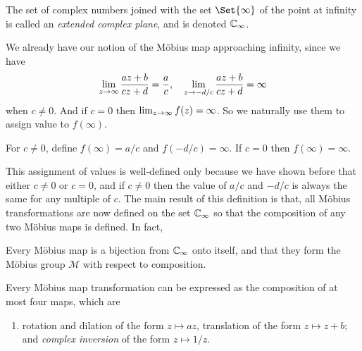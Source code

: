 \documentclass[main.tex]{subfiles}
\begin{document}
		\begin{definition}
			The set of complex numbers joined with the set $\Set{\infty}$ of the point at infinity is called an \textit{extended complex plane}, and is denoted $\mathbb C_\infty$.
		\end{definition}
		We already have our notion of the M\"obius map approaching infinity,  since we have
		\begin{equation*}
			\lim_{z \rightarrow \infty}\frac{az + b}{cz + d} = \frac{a}{c}, \quad \lim_{z \rightarrow {-d}/{c}} \frac{az + b}{cz + d} = \infty
		\end{equation*}
		when $c \neq 0$. And if $c = 0$ then $\lim_{z \rightarrow \infty} f(z) = \infty$. So we naturally use them to assign value to $f(\infty)$.
		\begin{definition}
			For $c \neq 0$, define $f(\infty) = a/c$ and $f(-d/c) = \infty$. If $c = 0$ then $f(\infty) = \infty$.
		\end{definition}
		This assignment of values is well-defined only because we have shown before that either $c\neq 0$ or $c = 0$, and if $c \neq 0$ then the value of $a/c$ and $-d/c$ is always the same for any multiple of $c$. The main result of this definition is that, all M\"obius transformations are now defined on the set $\mathbb C_\infty$ so that the composition of any two M\"obius maps is defined. In fact,
		\begin{theorem}
			Every M\"obius map is a bijection from $\mathbb C_\infty$ onto itself, and that they form the M\"obius group $\mathcal{M}$ with respect to composition.
		\end{theorem}
		\begin{theorem}
			Every M\"obius map transformation can be expressed as the composition of at most four maps, which are
			\begin{enumerate}
				\item rotation and dilation of the form $z \mapsto az$,
				\ii  translation of the form $z \mapsto z + b$; and
				\ii \textit{complex inversion} of the form $z \mapsto 1/z$.
			\end{enumerate}
		\end{theorem}
		
\end{document}
